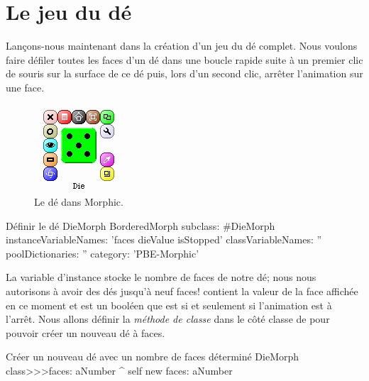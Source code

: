 \documentclass[a4paper,10pt,twoside]{book}
\begin{document}
\section{Le jeu du dé}

Lançons-nous maintenant dans la création d'un jeu
du dé complet. Nous voulons faire défiler toutes les faces d'un
dé dans une boucle rapide suite à un premier clic de
souris sur la surface de ce dé puis, lors
d'un second clic, arrêter l'animation sur une face.

\begin{figure}[ht]
	\centerline{\includegraphics[scale=0.65]{die}}
	\caption{Le dé dans Morphic.\label{fig:dialogDie}}
\end{figure}


\begin{classdef}{Définir le dé DieMorph}
BorderedMorph subclass: #DieMorph
	instanceVariableNames: 'faces dieValue isStopped'
	classVariableNames: ''
	poolDictionaries: ''
	category: 'PBE-Morphic'
\end{classdef}

La variable d'instance  stocke le nombre de faces de notre
dé; nous nous autorisons à avoir des dés jusqu'à neuf faces!
 contient la valeur de la face affichée en ce moment et
 est un booléen que est  si et seulement si
l'animation est à l'arrêt.
Nous allons définir la \emph{méthode de classe}  dans
le côté classe de  pour pouvoir créer un
nouveau dé à  faces.

\begin{method}{Créer un nouveau dé avec un nombre de faces déterminé}
DieMorph class>>>faces: aNumber
	^ self new faces: aNumber
\end{method}
\end{document}
